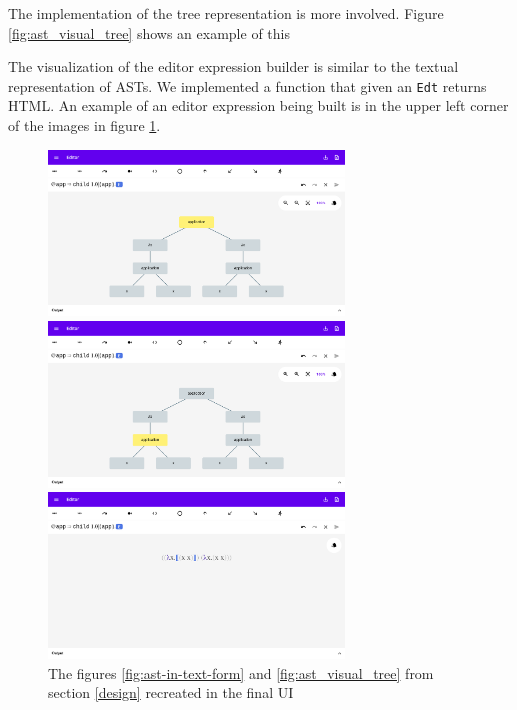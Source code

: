 The implementation of the tree representation is more involved. Figure
\ref{fig:ast_visual_tree} shows an example of this

The visualization of the editor expression builder is similar to the textual
representation of ASTs. We implemented a function that given an \texttt{Edt}
returns HTML. An example of an
editor expression being built is in the upper left corner of the images in
figure \ref{fig:final_ui}.

\begin{figure}
  \center
  \noindent\begin{minipage}{\textwidth}
    \center
    \includegraphics[width=0.7\textwidth]{assets/final_ui1.png}
  \end{minipage}\hfill
  \begin{minipage}{\textwidth}
    \center
    \includegraphics[width=0.7\textwidth]{assets/final_ui2.png}
  \end{minipage}\hfill
  \begin{minipage}{\textwidth}
    \center
    \includegraphics[width=0.7\textwidth]{assets/final_ui3.png}
  \end{minipage}\hfill
  \caption{The figures \ref{fig:ast-in-text-form} and \ref{fig:ast_visual_tree} from section \ref{design} recreated in the final UI}
  \label{fig:final_ui}
\end{figure}



